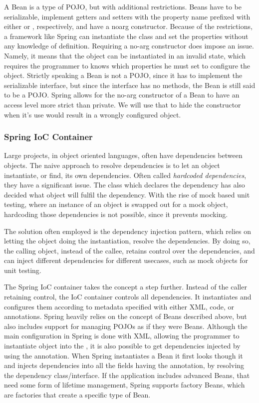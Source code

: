 A Bean is a type of \ac{POJO}, but with additional restrictions.
Beans have to be serializable, implement getters and setters with the property name prefixed with either  or , respectively, and have a noarg constructor.
Because of the restrictions, a framework like Spring can instantiate the class and set the properties without any knowledge of definition.
Requiring a no-arg constructor does impose an issue.
Namely, it means that the object can be instantiated in an invalid state, which requires the programmer to knows which properties he must set to configure the object.
Strictly speaking a Bean is not a \ac{POJO}, since it has to implement the serializable interface, but since the interface has no methods, the Bean is still said to be a \ac{POJO}.
Spring allows for the no-arg constructor of a Bean to have an access level more strict than private.
We will use that to hide the constructor when it's use would result in a wrongly configured object.

\subsubsection{Spring IoC Container}
Large projects, in object oriented languages, often have dependencies between objects.
The naive approach to resolve dependencies is to let an object instantiate, or find, its own dependencies.
Often called \textit{hardcoded dependencies}, they have a significant issue.
The class which declares the dependency has also decided what object will fulfil the dependency.
With the rise of mock based unit testing, where an instance of an object is swapped out for a mock object, hardcoding those dependencies is not possible, since it prevents mocking.

The solution often employed is the dependency injection pattern, which relies on letting the object doing the instantiation, resolve the dependencies.
By doing so, the calling object, instead of the callee, retains control over the dependencies, and can inject different dependencies for different usecases, such as mock objects for unit testing.

The Spring \ac{IoC} container takes the concept a step further.
Instead of the caller retaining control, the \ac{IoC} container controls all dependencies.
It instantiates and configures them according to metadata specified with either XML, code, or annotations.
Spring heavily relies on the concept of Beans described above, but also includes support for managing \acp{POJO} as if they were Beans.
Although the main configuration in Spring is done with XML, allowing the programmer to instantiate object into the , it is also possible to get dependencies injected by using the  annotation.
When Spring instantiates a Bean it first looks though it and injects dependencies into all the fields having the  annotation, by resolving the dependency class/interface.
If the application includes advanced Beans, that need some form of lifetime management, Spring supports factory Beans, which are factories that create a specific type of Bean.

